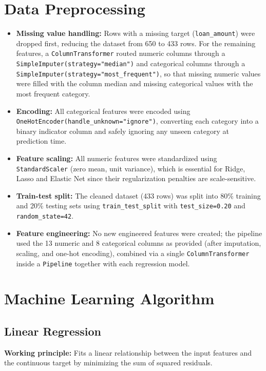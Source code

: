 \documentclass[12pt,a4paper]{article}
\begin{document}
\section{Data Preprocessing}
\begin{itemize}
\item \textbf{Missing value handling:} Rows with a missing target (\texttt{loan\_amount}) were dropped first, reducing the dataset from 650 to 433 rows. For the remaining features, a \texttt{ColumnTransformer} routed numeric columns through a \texttt{SimpleImputer(strategy="median")} and categorical columns through a \texttt{SimpleImputer(strategy="most\_frequent")}, so that missing numeric values were filled with the column median and missing categorical values with the most frequent category.
\item \textbf{Encoding:} All categorical features were encoded using \texttt{OneHotEncoder(handle\_unknown="ignore")}, converting each category into a binary indicator column and safely ignoring any unseen category at prediction time.
\item \textbf{Feature scaling:} All numeric features were standardized using \texttt{StandardScaler} (zero mean, unit variance), which is essential for Ridge, Lasso and Elastic Net since their regularization penalties are scale-sensitive.
\item \textbf{Train-test split:} The cleaned dataset (433 rows) was split into 80\% training and 20\% testing sets using \texttt{train\_test\_split} with \texttt{test\_size=0.20} and \texttt{random\_state=42}.
\item \textbf{Feature engineering:} No new engineered features were created; the pipeline used the 13 numeric and 8 categorical columns as provided (after imputation, scaling, and one-hot encoding), combined via a single \texttt{ColumnTransformer} inside a \texttt{Pipeline} together with each regression model.
\end{itemize}

\section{Machine Learning Algorithm}
\subsection*{Linear Regression}
\textbf{Working principle:} Fits a linear relationship between the input features and the continuous target by minimizing the sum of squared residuals.
\end{document}
